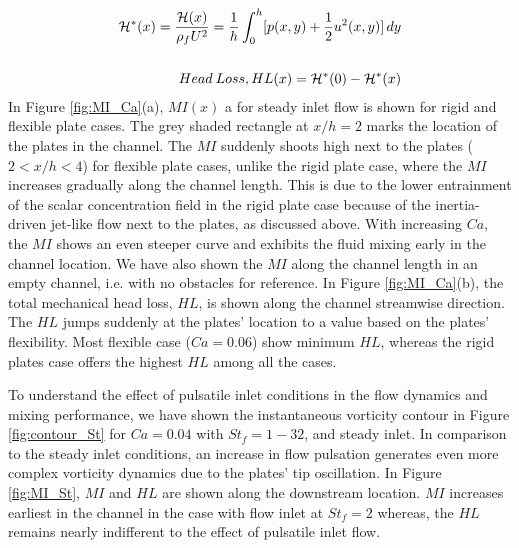 \documentclass[%
 aip,
 amsmath,amssymb,
 reprint,
]{revtex4-1}
\begin{document}
\begin{eqnarray*}
	\mathcal{H}^*(x)=\frac{\mathcal{H}(x)}{\rho_f U^2}=\frac{1}{h}\int_{0}^{h}[p(x,y)+{1\over2}  u^2(x,y)]\,dy \\ \\Head \: Loss, HL(x) = \mathcal{H}^*(0)-\mathcal{H}^*(x)
\end{eqnarray*}
In Figure \ref{fig:MI_Ca}(a), $MI(x)$ a for steady inlet flow is shown for rigid and flexible plate cases. The grey shaded rectangle at $x/h=2$ marks the location of the plates in the channel. The $MI$ suddenly shoots high next to the plates ($2<x/h<4$) for flexible plate cases, unlike the rigid plate case, where the $MI$ increases gradually along the channel length. This is due to the lower entrainment of the scalar concentration field in the rigid plate case because of the inertia-driven jet-like flow next to the plates, as discussed above. With increasing $Ca$, the $MI$ shows an even steeper curve and exhibits the fluid mixing early in the channel location. We have also shown the $MI$ along the channel length in an empty channel, i.e. with no obstacles for reference. In Figure \ref{fig:MI_Ca}(b), the total mechanical head loss, $HL$, is shown along the channel streamwise direction. The $HL$ jumps suddenly at the plates' location to a value based on the plates' flexibility. Most flexible case ($Ca=0.06$) show minimum $HL$, whereas the rigid plates case offers the highest $HL$ among all the cases.

To understand the effect of pulsatile inlet conditions in the flow dynamics and mixing performance, we have shown the instantaneous vorticity contour in Figure \ref{fig:contour_St} for $Ca=0.04$ with $St_f=1-32$, and steady inlet. In comparison to the steady inlet conditions, an increase in flow pulsation generates even more complex vorticity dynamics due to the plates' tip oscillation.
In Figure \ref{fig:MI_St}, $MI$ and $HL$ are shown along the downstream location. $MI$ increases earliest in the channel in the case with flow inlet at $St_f=2$ whereas, the $HL$ remains nearly indifferent to the effect of pulsatile inlet flow.
\end{document}
